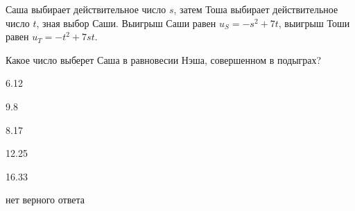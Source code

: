 
\begin{question}
Саша выбирает действительное число \(s\), затем Тоша выбирает действительное число \(t\), зная выбор Саши.
Выигрыш Саши равен \(u_S = -s^2 + 7t\), выигрыш Тоши равен \(u_T = -t^2 + 7 st\).

Какое число выберет Саша в равновесии Нэша, совершенном в подыграх?
\begin{answerlist}
  \item 6.12
  \item 9.8
  \item 8.17
  \item 12.25
  \item 16.33
  \item нет верного ответа
\end{answerlist}
\end{question}


